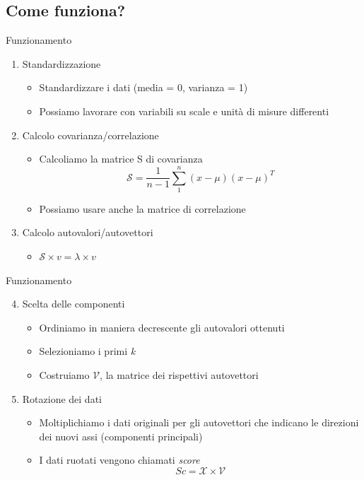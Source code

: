 \documentclass[xcolor={dvipsnames}]{beamer}%
\begin{document}
	\subsection{Come funziona?}
		\begin{frame}{Funzionamento}
			\begin{enumerate}
				\item Standardizzazione
				\begin{itemize}
					\footnotesize
					\item Standardizzare i dati (media = 0, varianza = 1)
					\item Possiamo lavorare con variabili su scale e unità di misure differenti
				\end{itemize}
				\item Calcolo covarianza/correlazione
				\begin{itemize}
					\footnotesize
					\item Calcoliamo la matrice S di covarianza $$\mathcal{S} = \frac{1}{n-1} \sum_{1}^{n} (x-\mu)(x-\mu)^T$$
					\item Possiamo usare anche la matrice di correlazione
				\end{itemize}
				\item Calcolo autovalori/autovettori 
				\begin{itemize}
					\item $\mathcal{S} \times v = \lambda \times v$
				\end{itemize}
			\end{enumerate}
		\end{frame}
	
		\begin{frame}{Funzionamento}
			\begin{enumerate}
				\setcounter{enumi}{3}
				\item Scelta delle componenti
				\begin{itemize}
					\footnotesize
					\item Ordiniamo in maniera decrescente gli autovalori ottenuti
					\item Selezioniamo i primi \emph{k}
					\item Costruiamo $\mathcal{V}$, la matrice dei rispettivi autovettori
				\end{itemize}
				\item Rotazione dei dati
				\begin{itemize}
					\footnotesize
					\item Moltiplichiamo i dati originali per gli autovettori che indicano le direzioni dei nuovi assi (componenti principali) 
					\item I dati ruotati vengono chiamati \emph{score} $$Sc = \mathcal{X} \times \mathcal{V}$$
				\end{itemize}
			\end{enumerate}
		\end{frame}
	
\end{document}
